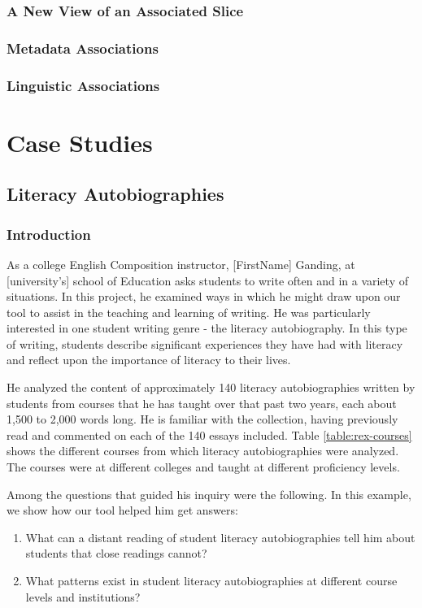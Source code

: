 \documentclass{sig-alternate}
\begin{document}
\subsubsection{A New View of an Associated Slice}

\subsubsection*{Metadata Associations}


\subsubsection*{Linguistic Associations}



\section{Case Studies}

\subsection{Literacy Autobiographies}

\subsubsection{Introduction}
As a college English Composition instructor,  [FirstName] Ganding, at  [university's] school of Education asks students to write often and in a variety of situations. In this project, he examined ways in which he might draw upon our tool to assist in the teaching and learning of writing. He was particularly interested in one student writing genre - the literacy autobiography. In this type of writing, students describe significant experiences they have had with literacy and reflect upon the importance of literacy to their lives.  

He analyzed the content of approximately 140 literacy autobiographies written by students from courses that he has taught over that past two years, each about 1,500 to 2,000 words long. He is familiar with the collection, having previously read and commented on each of the 140 essays included.  Table \ref{table:rex-courses} shows the different courses from which literacy autobiographies were analyzed. The courses were at different colleges and taught at different proficiency levels.

Among the questions that guided his inquiry were the following. In this example, we show how our tool helped him get answers:
\begin{enumerate}
\item What can a distant reading of student literacy autobiographies tell him about students that close readings cannot?
\item What patterns exist in student literacy autobiographies at different course levels and institutions?
\end{enumerate}
\end{document}
